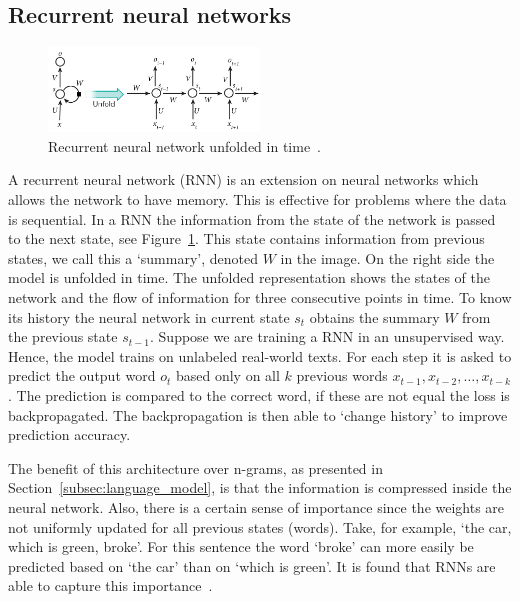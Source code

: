 \subsection{Recurrent neural networks}
\label{subsec:rnn}
\begin{figure}[htbp]
    \begin{center}
        \includegraphics[width=0.5\textwidth]{figures/rnn.jpg}
    \end{center}
    \caption{Recurrent neural network unfolded in time~\cite[Figure 5]{lecun2015deep}.}
    \label{fig:rnn}
\end{figure}
A recurrent neural network (RNN) is an extension on neural networks which allows the network to have memory.
This is effective for problems where the data is sequential.
In a RNN the information from the state of the network is passed to the next state, see Figure~\ref{fig:rnn}.
This state contains information from previous states, we call this a `summary', denoted $W$ in the image.
On the right side the model is unfolded in time.
The unfolded representation shows the states of the network and the flow of information for three consecutive points in time.
To know its history the neural network in current state $s_t$ obtains the summary $W$ from the previous state $s_{t-1}$.
Suppose we are training a RNN in an unsupervised way.
Hence, the model trains on unlabeled real-world texts.
For each step it is asked to predict the output word $o_t$ based only on all $k$ previous words $x_{t-1}, x_{t-2}, \ldots, x_{t-k}$.
The prediction is compared to the correct word, if these are not equal the loss is backpropagated.
The backpropagation is then able to `change history' to improve prediction accuracy.

The benefit of this architecture over n-grams, as presented in Section~\ref{subsec:language_model}, is that the information is compressed inside the neural network.
Also, there is a certain sense of importance since the weights are not uniformly updated for all previous states (words).
Take, for example, `the car, which is green, broke'.
For this sentence the word `broke' can more easily be predicted based on `the car' than on `which is green'.
It is found that RNNs are able to capture this importance~\citep{manning2017lectures}.

